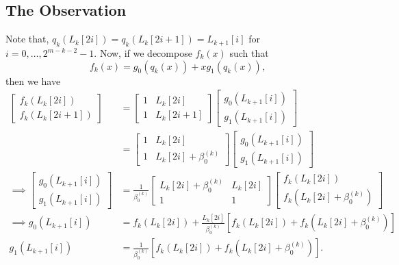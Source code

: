 \documentclass[11pt,runningheads]{llncs}
\begin{document}
\subsection{The Observation}
Note that, $q_k(L_{k}[2i])=q_k(L_{k}[2i+1])=L_{k+1}[i]$ for $i=0,\ldots,2^{m-k-2}-1$. Now, if we decompose $f_{k}(x)$ such that
\begin{equation}\label{Eqn:Radix-2Decomp}
    f_{k}(x)= g_0(q_k(x))+ xg_1(q_k(x)),
\end{equation}
then we have
\begin{equation*}
    \begin{aligned}
        \begin{bmatrix}
            f_{k}(L_{k}[2i])\\
            f_{k}(L_{k}[2i+1])
        \end{bmatrix}
        &=
        \begin{bmatrix}
            1 & L_{k}[2i]\\
            1 & L_{k}[2i+1]
        \end{bmatrix}
        \begin{bmatrix}
            g_0(L_{k+1}[i])\\
            g_1(L_{k+1}[i])
        \end{bmatrix}\\
        &=
        \begin{bmatrix}
            1 & L_{k}[2i]\\
            1 & L_{k}[2i]+\beta_{0}^{(k)}
        \end{bmatrix}
        \begin{bmatrix}
            g_0(L_{k+1}[i])\\
            g_1(L_{k+1}[i])
        \end{bmatrix}\\
        \implies
        \begin{bmatrix}
            g_0(L_{k+1}[i])\\
            g_1(L_{k+1}[i])
        \end{bmatrix} 
        &=
        \frac{1}{\beta_{0}^{(k)}}
        \begin{bmatrix}
            L_{k}[2i]+\beta_{0}^{(k)} & L_{k}[2i]\\
            1 & 1
        \end{bmatrix}
        \begin{bmatrix}
            f_{k}(L_{k}[2i])\\
            f_{k}(L_{k}[2i]+ \beta_{0}^{(k)})
        \end{bmatrix}\\
        \implies
        g_0(L_{k+1}[i])&= f_{k}(L_{k}[2i]) + \frac{L_{k}[2i]}{\beta_{0}^{(k)}} [f_{k}(L_{k}[2i]) +  f_{k}(L_{k}[2i]+\beta_{0}^{(k)})]\\
        g_1(L_{k+1}[i])& =  \frac{1}{\beta_{0}^{(k)}}[f_{k}(L_{k}[2i]) +  f_{k}(L_{k}[2i]+\beta_{0}^{(k)})].
    \end{aligned}
\end{equation*}
\end{document}
